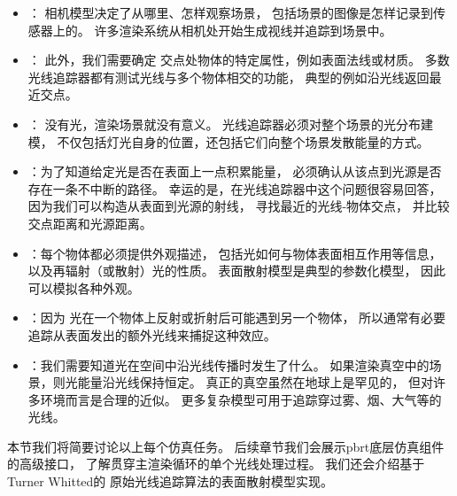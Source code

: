 \begin{itemize}
    \item {}： 相机模型决定了从哪里、怎样观察场景，
          包括场景的图像是怎样记录到传感器上的。
          许多渲染系统从相机处开始生成视线并追踪到场景中。
    \item {}： 此外，我们需要确定
          交点处物体的特定属性，例如表面法线或材质。
          多数光线追踪器都有测试光线与多个物体相交的功能，
          典型的例如沿光线返回最近交点。
    \item {}： 没有光，渲染场景就没有意义。
          光线追踪器必须对整个场景的光分布建模，
          不仅包括灯光自身的位置，还包括它们向整个场景发散能量的方式。
    \item {}：为了知道给定光是否在表面上一点积累能量，
          必须确认从该点到光源是否存在一条不中断的路径。
          幸运的是，在光线追踪器中这个问题很容易回答，
          因为我们可以构造从表面到光源的射线，
          寻找最近的光线-物体交点，
          并比较交点距离和光源距离。
    \item {}：每个物体都必须提供外观描述，
          包括光如何与物体表面相互作用等信息，
          以及再辐射（或散射）光的性质。
          表面散射模型是典型的参数化模型，
          因此可以模拟各种外观。
    \item {}：因为
          光在一个物体上反射或折射后可能遇到另一个物体，
          所以通常有必要追踪从表面发出的额外光线来捕捉这种效应。
    \item {}：我们需要知道光在空间中沿光线传播时发生了什么。
          如果渲染真空中的场景，则光能量沿光线保持恒定。
          真正的真空虽然在地球上是罕见的，
          但对许多环境而言是合理的近似。
          更多复杂模型可用于追踪穿过雾、烟、大气等的光线。
\end{itemize}

本节我们将简要讨论以上每个仿真任务。
后续章节我们会展示pbrt底层仿真组件的高级接口，
了解贯穿主渲染循环的单个光线处理过程。
我们还会介绍基于Turner Whitted的
原始光线追踪算法的表面散射模型实现。

